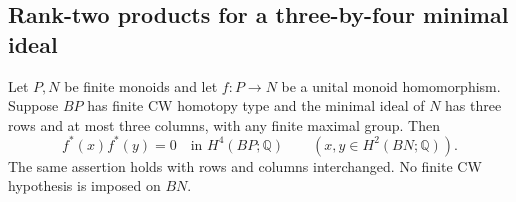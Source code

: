 \subsection{Rank-two products for a three-by-four minimal ideal}

\begin{lemma}
\label{CP2:A-relative-three-by-three}
Let $P,N$ be finite monoids and let $f:P\to N$ be a unital
monoid homomorphism. Suppose $BP$ has finite CW homotopy type
and the minimal ideal of $N$ has three rows and at most three
columns, with any finite maximal group. Then
\[
 f^*(x)f^*(y)=0\quad\text{in }H^4(BP;\mathbb Q)
 \qquad(x,y\in H^2(BN;\mathbb Q)).
\]
The same assertion holds with rows and columns interchanged.
No finite CW hypothesis is imposed on $BN$.
\end{lemma}
